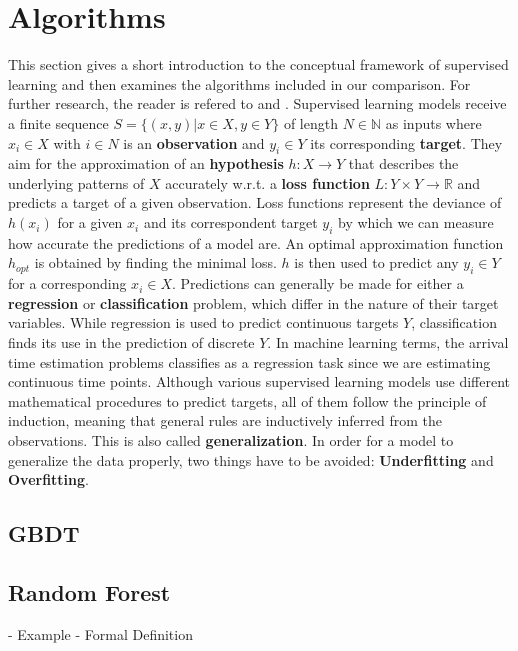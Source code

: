 \section{Algorithms}
This section gives a short introduction to the conceptual framework of supervised learning and then examines the algorithms included in our comparison. For further research, the reader is refered to \cite{Bishop} and \cite{SLFoundations}.
\newline
\newline
Supervised learning models receive a finite sequence 
$S = \{(x, y) | x \in X, y \in Y\}$ of length $N \in \mathbb{N}$ as inputs where $x_i \in X$ with $i \in N$ is an \textbf{observation} and $y_i \in Y$ its corresponding \textbf{target}. They aim for the approximation of an \textbf{hypothesis} $h: X \to Y$ that describes the underlying patterns of $X$ accurately w.r.t. a \textbf{loss function} $L: Y \times Y \to \mathbb{R}$ and predicts a target of a given observation. Loss functions represent the deviance of $h(x_i)$ for a given $x_i$ and its correspondent target $y_i$ by which we can measure how accurate the predictions of a model are. An optimal approximation function $h_{opt}$ is obtained by finding the minimal loss. $h$ is then used to predict any $y_i \in Y$ for a corresponding $x_i \in X$.  
\newline
Predictions can generally be made for either a \textbf{regression} or \textbf{classification} problem, which differ in the nature of their target variables. While regression is used to predict continuous targets $Y$, classification finds its use in the prediction of discrete $Y$. In machine learning terms, the arrival time estimation problems classifies as a regression task since we are estimating continuous time points. 
Although various supervised learning models use different mathematical procedures to predict targets, all of them follow the principle of induction, meaning that general rules are inductively inferred from the  observations. This is also called \textbf{generalization}.  
In order for a model to generalize the data properly, two things have to be avoided: \textbf{Underfitting} and \textbf{Overfitting}.


\subsection{GBDT}

\subsection{Random Forest}
- Example
- Formal Definition
